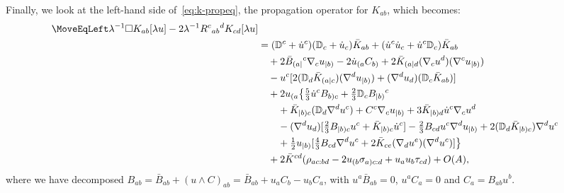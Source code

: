 \documentclass[a4paper]{article}
\theoremstyle{remark}
\newcommand{\la}{\lambda}
\newcommand{\D}{\mathbb{D}}
\begin{document}
%
Finally, we look at the left-hand side of~\eqref{eq:k-propeq}, the propagation operator for $K_{ab}$, which becomes:
\begin{align}
	\notag
	\MoveEqLeft
	\la^{-1} \square K_{ab}[\la u] - 2 \la^{-1} R^c{}_{ab}{}^d K_{cd}[\la u]
	\\ \notag
	&= (\D^c + \dot{u}^c)(\D_c + \dot{u}_c)\bar{K}_{ab} + (\dot{u}^c\dot{u}_c + \dot{u}^c \D_c)\bar{K}_{ab}
	\\ \notag & \quad {}
		+ 2\bar{B}_{(a|}{}^c \nabla_c u_{|b)} - 2 \dot{u}_{(a} C_{b)} + 2 \bar{K}_{(a|d}(\nabla_c u^d)(\nabla^c u_{|b)})
	\\ \notag & \quad {}
		- u^c [2(\D_d \bar{K}_{(a|c})(\nabla^d u_{|b)}) + (\nabla^d u_d)(\D_c \bar{K}_{ab})]
	\\ \notag & \quad {}
		+2 u_{(a} \big\{ \tfrac{5}{3} \dot{u}^c B_{b)c} + \tfrac{2}{3} \D_c B_{|b)}{}^c
	\\ \notag & \qquad {}
		+ \bar{K}_{|b)c} (\D_d \nabla^d u^c) + C^c \nabla_c u_{|b)} + 3\bar{K}_{|b)d} \dot{u}^c \nabla_c u^d
	\\ \notag & \qquad {}
		- (\nabla^d u_d)[\tfrac{2}{3} B_{|b)c} u^c + \bar{K}_{|b)c} \dot{u}^c] - \tfrac{2}{3} B_{cd} u^c \nabla^d u_{|b)} + 2(\D_d \bar{K}_{|b)c}) \nabla^d u^c
	\\ \notag & \qquad {}
		+\tfrac{1}{2} u_{|b)}[\tfrac{4}{3} B_{cd} \nabla^d u^c + 2\bar{K}_{ce}(\nabla_d u^e)(\nabla^d u^c)] \big\}
	\\ \label{eq:KB-propeq-P} & \quad {}
		+ 2 \bar{K}^{cd} (\rho_{ac:bd} - 2 u_{(b} \sigma_{a)c:d} + u_a u_b \tau_{cd})
		+ O(A)
	,
\end{align}
where we have decomposed $B_{ab} = \bar{B}_{ab} + (u \wedge
C)_{ab} = \bar{B}_{ab} + u_a C_b - u_b C_a$, with $u^a \bar{B}_{ab} =
0$, $u^a C_a = 0$ and $C_a = B_{ab} u^b$.
\end{document}
